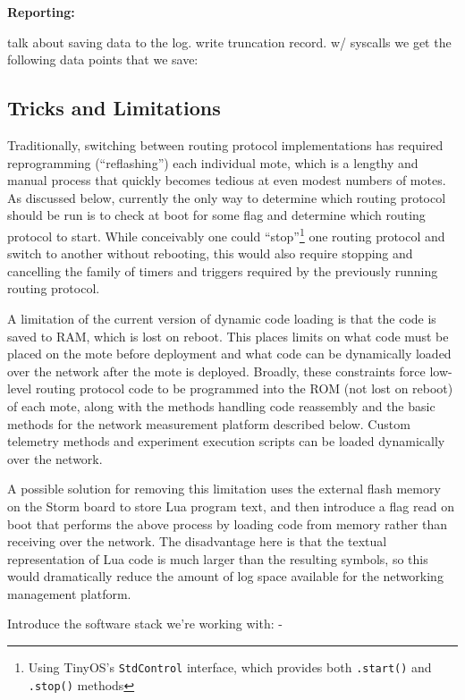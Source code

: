 \textbf{Reporting:}

talk about saving data to the log. write truncation record. w/ syscalls we get the following data points that we save:

\subsection{Tricks and Limitations}

Traditionally, switching between routing protocol implementations has required reprogramming (``reflashing'') each individual mote, which is a lengthy and manual process that quickly becomes tedious at even modest numbers of motes.
As discussed below, currently the only way to determine which routing protocol should be run is to check at boot for some flag and determine which routing protocol to start.
While conceivably one could ``stop''\footnote{Using TinyOS's \texttt{StdControl} interface, which provides both \texttt{.start()} and \texttt{.stop()} methods} one routing protocol and switch to another without rebooting, this would also require stopping and cancelling the family of timers and triggers required by the previously running routing protocol.

A limitation of the current version of dynamic code loading is that the code is saved to RAM, which is lost on reboot.
This places limits on what code must be placed on the mote before deployment and what code can be dynamically loaded over the network after the mote is deployed.
Broadly, these constraints force low-level routing protocol code to be programmed into the ROM (not lost on reboot) of each mote, along with the methods handling code reassembly and the basic methods for the network measurement platform described below.
Custom telemetry methods and experiment execution scripts can be loaded dynamically over the network.

A possible solution for removing this limitation uses the external flash memory on the Storm board to store Lua program text, and then introduce a flag read on boot that performs the above process by loading code from memory rather than receiving over the network.
The disadvantage here is that the textual representation of Lua code is much larger than the resulting symbols, so this would dramatically reduce the amount of log space available for the networking management platform.

Introduce the software stack we're working with:
-
\fi


